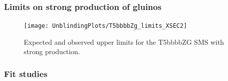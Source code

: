 \subsubsection*{Limits on strong production of gluinos}

\begin{figure}[tbp]
 \centering
 \texttt{[image: UnblindingPlots/T5bbbbZg\_limits\_XSEC2]}
 \caption{Expected and observed upper limits for the T5bbbbZG SMS with strong production.}
 \label{fig:limitStrong}
\end{figure}

\subsubsection*{Fit studies}
